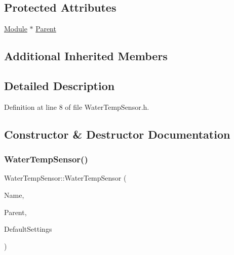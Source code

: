 \subsection*{Protected Attributes}
\begin{DoxyCompactItemize}
\item 
\hyperlink{class_module}{Module} $\ast$ \hyperlink{class_water_temp_sensor_a955eb4c3335d1971cec6c2d68d29c8c6}{Parent}
\end{DoxyCompactItemize}
\subsection*{Additional Inherited Members}


\subsection{Detailed Description}


Definition at line 8 of file Water\+Temp\+Sensor.\+h.



\subsection{Constructor \& Destructor Documentation}
\mbox{\label{class_water_temp_sensor_a88e6058500175b82a043ad682f968011}} 
\subsubsection{\texorpdfstring{Water\+Temp\+Sensor()}{WaterTempSensor()}\hspace{0.1cm}{\footnotesize\ttfamily [1/2]}}
{\footnotesize\ttfamily Water\+Temp\+Sensor\+::\+Water\+Temp\+Sensor (\begin{DoxyParamCaption}\item[{const \+\_\+\+\_\+\+Flash\+String\+Helper $\ast$}]{Name,  }\item[{\hyperlink{class_module}{Module} $\ast$}]{Parent,  }\item[{\hyperlink{struct_settings_1_1_water_temp_sensor_settings}{Settings\+::\+Water\+Temp\+Sensor\+Settings} $\ast$}]{Default\+Settings }\end{DoxyParamCaption})}



